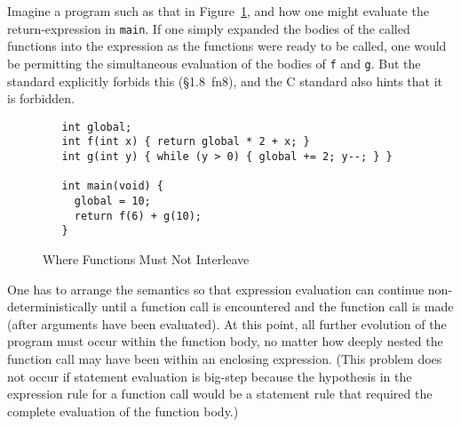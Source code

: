 \documentclass[11pt]{article}
\begin{document}
Imagine a program such as that in Figure~\ref{fig:two-functions}, and
how one might evaluate the return-expression in \texttt{main}.  If one
simply expanded the bodies of the called functions into the expression
as the functions were ready to be called, one would be permitting the
simultaneous evaluation of the bodies of \texttt{f} and \texttt{g}.
But the \cpp{} standard explicitly forbids this (\S1.8~fn8), and the C
standard also hints that it is forbidden.
\begin{figure}[htbp]
\begin{verbatim}
   int global;
   int f(int x) { return global * 2 + x; }
   int g(int y) { while (y > 0) { global += 2; y--; } }

   int main(void) {
     global = 10;
     return f(6) + g(10);
   }
\end{verbatim}
\caption{Where Functions Must Not Interleave}
\label{fig:two-functions}
\end{figure}

One has to arrange the semantics so that expression evaluation can
continue non-deterministically until a function call is encountered
and the function call is made (after arguments have been evaluated).
At this point, all further evolution of the program must occur within
the function body, no matter how deeply nested the function call may
have been within an enclosing expression.  (This problem does not
occur if statement evaluation is big-step because the hypothesis in
the expression rule for a function call would be a statement rule that
required the complete evaluation of the function body.)
\end{document}
